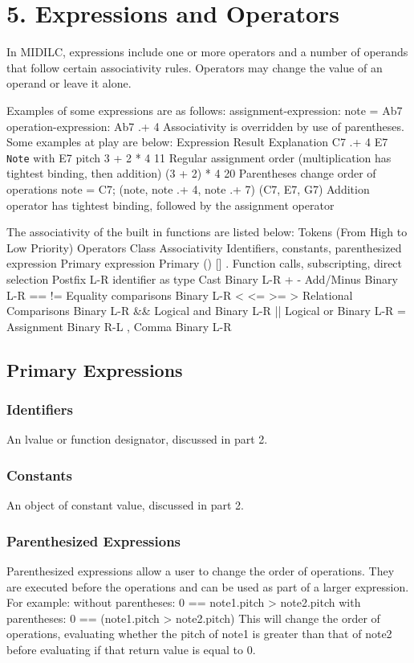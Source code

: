 \documentclass[12pt,A4]{book}
\begin{document}
\section{5. Expressions and Operators}

In MIDILC, expressions include one or more operators and a number of operands that follow certain associativity rules. Operators may change the value of an operand or leave it alone.

Examples of some expressions are as follows:
assignment-expression:    note = Ab7
operation-expression:        Ab7 .+ 4
Associativity is overridden by use of parentheses. Some examples at play are below:
Expression	Result	Explanation
C7 .+ 4 	E7	\verb|Note| with E7 pitch
3 + 2 * 4	11	Regular assignment order (multiplication has tightest binding, then addition)
(3 + 2) * 4	20	Parentheses change order of operations
note = C7;
(note, note .+ 4, note .+ 7) 	(C7, E7, G7)	Addition operator has tightest binding, followed by the assignment operator


The associativity of the built in functions are listed below:
Tokens (From High to Low Priority)	Operators	Class	Associativity
Identifiers, constants,
parenthesized expression	Primary expression 	Primary	
() [] .	Function calls, subscripting, direct selection	Postfix	L-R
identifier as type	Cast	Binary	L-R
+ -	Add/Minus	Binary	L-R
== !=	Equality comparisons	Binary	L-R
< <= >= >	Relational Comparisons	Binary	L-R
&&	Logical and	Binary	L-R
||	Logical or	Binary	L-R
=	Assignment 	Binary	R-L
,	Comma	Binary	L-R


\subsection{Primary Expressions}
\subsubsection{Identifiers}
An lvalue or function designator, discussed in part 2.
\subsubsection{Constants}
An object of constant value, discussed in part 2.
\subsubsection{Parenthesized Expressions}
Parenthesized expressions allow a user to change the order of operations. They are executed before the operations and can be used as part of a larger expression. For example:
without parentheses: 0 == note1.pitch > note2.pitch
with parentheses:      0 == (note1.pitch > note2.pitch)
This will change the order of operations, evaluating whether the pitch of note1 is greater than that of note2 before evaluating if that return value is equal to 0.
\end{document}
